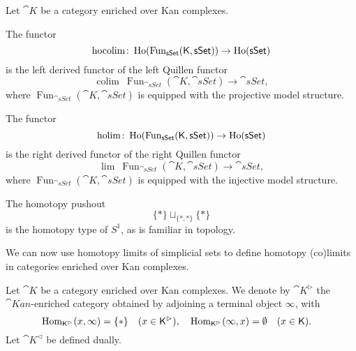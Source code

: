 \begin{definition}
    Let $\cat K$ be a category enriched over Kan complexes.
    \begin{itms}
        \item The  functor
        \[ \operatorname{hocolim}\colon\operatorname{Ho}(\operatorname{Fun}_{\mathsf{sSet}}(\mathsf{K},\mathsf{sSet}))\to\operatorname{Ho}(\mathsf{sSet}) \]
        is the left derived functor of the left Quillen functor 
        \[ \operatorname{colim}\:\operatorname{Fun}_{\cat{sSet}}(\cat K,\cat{sSet})\to\cat{sSet}, \]
        where $\operatorname{Fun}_{\cat{sSet}}(\cat K,\cat{sSet})$
        is equipped with the projective model structure.

        \item The  functor
        \[ \operatorname{holim}\colon\operatorname{Ho}(\operatorname{Fun}_{\mathsf{sSet}}(\mathsf{K},\mathsf{sSet}))\to\operatorname{Ho}(\mathsf{sSet}) \]
        is the right derived functor of the right Quillen functor 
        \[ \operatorname{lim}\:\operatorname{Fun}_{\cat{sSet}}(\cat K,\cat{sSet})\to\cat{sSet}, \]
        where $\operatorname{Fun}_{\cat{sSet}}(\cat K,\cat{sSet})$
        is equipped with the injective model structure.
    \end{itms}
\end{definition}

\begin{example}
    The homotopy pushout
    \[ \{*\}\mathop{\sqcup}_{\{*,*\}}\{*\} \]
    is the homotopy type of $S^1$, as is familiar in topology.
    \varqed
\end{example}

We can now use homotopy limits of simplicial sets 
to define homotopy (co)limits in categories enriched over Kan complexes.

Let $\cat K$ be a category enriched over Kan complexes.
We denote by $\cat K^\vartriangleright$ the $\cat{Kan}$-enriched category obtained
by adjoining a terminal object $\infty$, with 
\[ \operatorname{Hom}_{\mathsf{K}^\vartriangleright}(x,\infty)=\{*\}\quad(x\in\mathsf{K}^\vartriangleright),\quad
\operatorname{Hom}_{\mathsf{K}^\vartriangleright}(\infty,x)=\emptyset\quad(x\in\mathsf{K}).\quad  \]
Let $\cat K^\vartriangleleft$ be defined dually.

